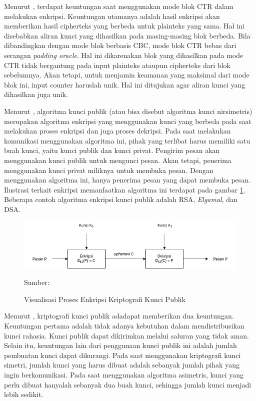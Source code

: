 Menurut \textcite{munir2019}, terdapat keuntungan saat menggunakan mode blok CTR dalam melakukan enkripsi. Keuntungan utamanya adalah hasil enkripsi akan memberikan hasil cipherteks yang berbeda untuk plainteks yang sama. Hal ini disebabkan aliran kunci yang dihasilkan pada masing-masing blok berbeda. Bila dibandingkan dengan mode blok berbasis CBC, mode blok CTR bebas dari serangan \emph{padding oracle}. Hal ini dikarenakan blok yang dihasilkan pada mode CTR tidak bergantung pada input plainteks ataupun cipherteks dari blok sebelumnya. Akan tetapi, untuk menjamin keamanan yang maksimal dari mode blok ini, input counter haruslah unik. Hal ini ditujukan agar aliran kunci yang dihasilkan juga unik.

Menurut \textcite{munir2019}, algoritma kunci publik (atau bisa disebut algoritma kunci nirsimetris) merupakan algoritma enkripsi yang menggunakan kunci yang berbeda pada saat melakukan proses enkripsi dan juga proses dekripsi. Pada saat melakukan komunikasi menggunakan algoritma ini, pihak yang terlibat harus memiliki satu buah kunci, yaitu kunci publik dan kunci privat. Pengirim pesan akan menggunakan kunci publik untuk mengunci pesan. Akan tetapi, penerima menggunakan kunci privat miliknya untuk membuka pesan. Dengan menggunakan algoritma ini, hanya penerima pesan yang dapat membuka pesan. Ilustrasi terkait enkripsi memanfaatkan algoritma ini terdapat pada gambar \ref{fig:crypto.asymetric}. Beberapa contoh algoritma enkripsi kunci publik adalah RSA, \emph{Elgamal}, dan DSA.

\begin{figure}[!h]
  \centering
  \includegraphics[width=\textwidth]{chapters/res/chapter-2/img/crypto.asymetric.png}
  \caption{Visualisasi Proses Enkripsi Kriptografi Kunci Publik} 
  \label{fig:crypto.asymetric}
  Sumber: \textcite{munir2019}
\end{figure}

Menurut \textcite{munir2019}, kriptografi kunci publik adadapat memberikan dua keuntungan. Keuntungan pertama adalah tidak adanya kebutuhan dalam mendistribusikan kunci rahasia. Kunci publik dapat dikirimkan melalui saluran yang tidak aman. Selain itu, keuntungan lain dari penggunaan kunci publik ini adalah jumlah pembuatan kunci dapat dikurangi. Pada saat menggunakan kriptografi kunci simetri, jumlah kunci yang harus dibuat adalah sebanyak jumlah pihak yang ingin berkomunikasi. Pada saat menggunakan algoritma asimetris, kunci yang perlu dibuat hanyalah sebanyak dua buah kunci, sehingga jumlah kunci menjadi lebih sedikit.

